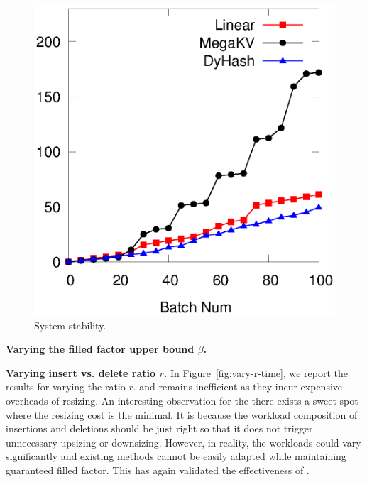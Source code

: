 \begin{figure}[h]
\begin{minipage}{0.18\linewidth}
		\centerline{\dsali}
	\end{minipage}
	\hfill
	\begin{minipage}{0.18\linewidth}\centering
		\includegraphics[width=\linewidth]{pic/dynamic-stability/dynamic-sta-random.eps}
		\centerline{\dsrandom}
	\end{minipage}
	\caption{System stability.}
	\label{fig:vary-alpha-stability}
\end{figure}

\vspace{1mm}\noindent\textbf{Varying the filled factor upper bound $\beta$.}


\vspace{1mm}\noindent\textbf{Varying insert vs. delete ratio $r$.}
In Figure~\ref{fig:vary-r-time}, we report the results for varying the ratio $r$. \linear and \megakv remains inefficient as they incur expensive overheads of resizing. An interesting observation for \linear the \megakv there exists a sweet spot where the resizing cost is the minimal.
It is because the workload composition of insertions and deletions should be just right so that it does not trigger unnecessary upsizing or downsizing. However, in reality, the workloads could vary significantly and existing methods cannot be easily adapted while maintaining guaranteed filled factor. This has again validated the effectiveness of \voter.  

